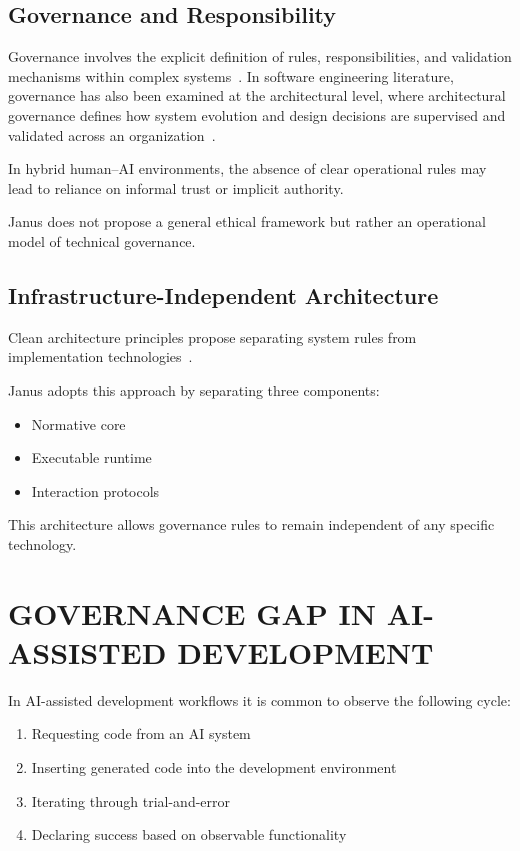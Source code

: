 \documentclass[conference]{IEEEtran}
\begin{document}
\subsection{Governance and Responsibility}
Governance involves the explicit definition of rules, responsibilities, and validation mechanisms within complex systems~\cite{kooi2003}. In software engineering literature, governance has also been examined at the architectural level, where architectural governance defines how system evolution and design decisions are supervised and validated across an organization~\cite{booch2006}.

In hybrid human--AI environments, the absence of clear operational rules may lead to reliance on informal trust or implicit authority.

Janus does not propose a general ethical framework but rather an operational model of technical governance.

\subsection{Infrastructure-Independent Architecture}
Clean architecture principles propose separating system rules from implementation technologies~\cite{martin2017}.

Janus adopts this approach by separating three components:
\begin{itemize}
  \item Normative core
  \item Executable runtime
  \item Interaction protocols
\end{itemize}

This architecture allows governance rules to remain independent of any specific technology.

\section{GOVERNANCE GAP IN AI-ASSISTED DEVELOPMENT}
In AI-assisted development workflows it is common to observe the following cycle:
\begin{enumerate}
  \item Requesting code from an AI system
  \item Inserting generated code into the development environment
  \item Iterating through trial-and-error
  \item Declaring success based on observable functionality
\end{enumerate}
\end{document}
